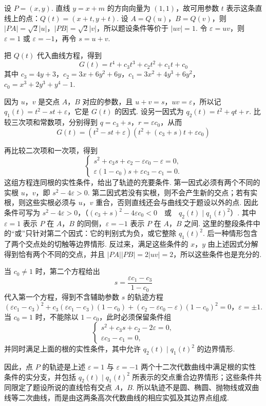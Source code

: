 \documentclass[UTF8,a4paper,oneside,11pt]{ctexbook}
\begin{document}
\begin{solution}
设 \(P=(x,y)\). 直线 \(y=x+m\) 的方向向量为 \((1,1)\)，故可用参数 \(t\) 表示这条直线上的点：\(Q(t)=(x+t,y+t)\). 设 \(A=Q(u)\)，\(B=Q(v)\)，则 \(\left|PA\right|=\sqrt{2}\left|u\right|\)，\(\left|PB\right|=\sqrt{2}\left|v\right|\)，所以题设条件等价于 \(\left|uv\right|=1\). 令 \(\varepsilon=uv\)，则 \(\varepsilon=1\) 或 \(\varepsilon=-1\)，再令 \(s=u+v\).

把 \(Q(t)\) 代入曲线方程，得到
\[
G(t)=t^4+c_3t^3+c_2t^2+c_1t+c_0
\]
其中 \(c_3=4y+3\)，\(c_2=3x+6y^2+6y\)，\(c_1=3x^2+4y^3+6y^2\)，\(c_0=x^3+2y^3+y^4-1\).

因为 \(u\)，\(v\) 是交点 \(A\)，\(B\) 对应的参数，且 \(u+v=s\)，\(uv=\varepsilon\)，所以记 \(q_1(t)=t^2-st+\varepsilon\)，它是 \(G(t)\) 的因式. 设另一因式为 \(q_2(t)=t^2+qt+r\). 比较三次项和常数项，分别得到 \(q=c_3+s\)，\(r=\varepsilon c_0\)，从而
\[
G(t)=\left(t^2-st+\varepsilon\right)\left(t^2+(c_3+s)t+\varepsilon c_0\right)
\]

再比较二次项和一次项，得到
\[
\begin{cases}
s^2+c_3s+c_2-\varepsilon c_0-\varepsilon=0,\\
\varepsilon(1-c_0)s+\varepsilon c_3-c_1=0.
\end{cases}
\]
这组方程连同根的实性条件，给出了轨迹的充要条件. 第一因式必须有两个不同的实根 \(u\)，\(v\)，即 \(s^2-4\varepsilon>0\). 第二因式若没有实根，则不会产生新的交点；若有实根，则这些实根必须与 \(u\)，\(v\) 重合，否则直线还会与曲线交于题设以外的点. 因此条件可写为
\(s^2-4\varepsilon>0\)，（\((c_3+s)^2-4\varepsilon c_0<0\quad\text{或}\quad q_2(t)\mid q_1(t)^2\)）.
其中 \(\varepsilon=1\) 表示 \(P\) 在 \(A\)，\(B\) 的同侧，\(\varepsilon=-1\) 表示 \(P\) 在 \(A\)，\(B\) 之间. 这里的整段条件中的“或”只针对第二个因式：它的判别式为负，或它整除 \(q_1(t)^2\). 后一种情形包含了两个交点处的切触等边界情形. 反过来，满足这些条件的 \(x\)，\(y\) 由上述因式分解得到恰有两个不同的交点，并且 \(\left|PA\right|\left|PB\right|=2\left|uv\right|=2\)，所以这些条件也是充分的.

当 \(c_0\neq1\) 时，第二个方程给出
\[
s=\frac{\varepsilon c_1-c_3}{1-c_0}
\]
代入第一个方程，得到不含辅助参数 \(s\) 的轨迹方程
\(\left(\varepsilon c_1-c_3\right)^2+c_3\left(\varepsilon c_1-c_3\right)\left(1-c_0\right)+\left(c_2-\varepsilon c_0-\varepsilon\right)\left(1-c_0\right)^2=0\)，\(\varepsilon=\pm1\).
当 \(c_0=1\) 时，不能除以 \(1-c_0\)，此时必须保留条件组
\[
\begin{cases}
s^2+c_3s+c_2-2\varepsilon=0,\\
\varepsilon c_3-c_1=0,
\end{cases}
\]
并同时满足上面的根的实性条件，其中允许 \(q_2(t)\mid q_1(t)^2\) 的边界情形.

因此，点 \(P\) 的轨迹是上述 \(\varepsilon=1\) 与 \(\varepsilon=-1\) 两个十二次代数曲线中满足根的实性条件的实分支，并包括 \(q_2(t)\mid q_1(t)^2\) 所表示的交点重合边界情形；这些条件共同限定了题设所说的直线恰有交点 \(A\)，\(B\). 所以轨迹不是圆、椭圆、抛物线或双曲线等二次曲线，而是由这两条高次代数曲线的相应实弧及其边界点组成.
\end{solution}

\end{document}

